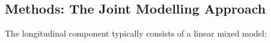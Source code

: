 \documentclass[10pt,a0,portrait]{a0poster}
\begin{document}
\color{DarkSlateGray}
\begin{multicols}{2}
\section*{Methods: \large{The Joint Modelling Approach}}
\vspace{-1cm}
\begin{center}
    \label{Fig1}
\end{center}
\vspace{2cm}
\par{The longitudinal component typically consists of a linear mixed model:}


\end{multicols}
\end{document}
